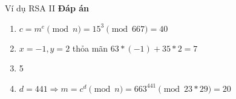 \begin{frame}{Ví dụ RSA II}
\textbf{Đáp án}
\begin{enumerate}
    \item $c=m^e \pmod n = 15^3 \pmod{667} = 40$
    \item $x=-1, y=2$ thỏa mãn $63*(-1)+35*2=7$
    \item 5
    \item $d=441 \Rightarrow m=c^d \pmod n = 663^{441} \pmod{23*29} = 20$
\end{enumerate}
\end{frame}